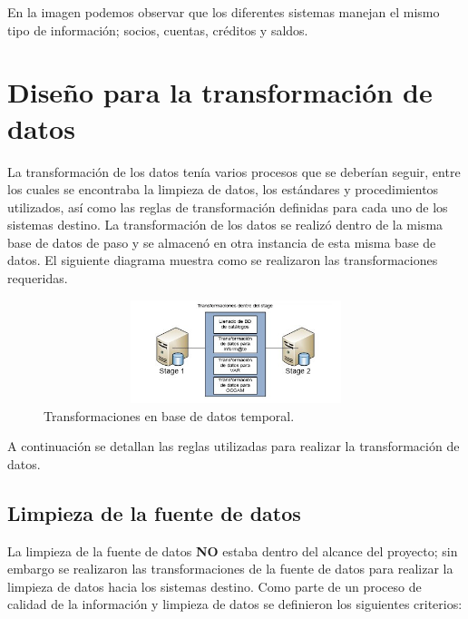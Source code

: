 En la imagen podemos observar que los diferentes sistemas manejan el mismo tipo
de información; socios, cuentas, créditos y saldos.

\section{Diseño para la transformación de datos}

La transformación de los datos tenía varios procesos que se deberían seguir,
entre los cuales se encontraba la limpieza de datos, los estándares y
procedimientos utilizados, así como las reglas de transformación definidas para
cada uno de los sistemas destino. La transformación de los datos se realizó
dentro de la misma base de datos de paso y se almacenó en otra instancia de esta
misma base de datos. El siguiente diagrama muestra como se realizaron las
transformaciones requeridas.

\begin{figure}[htb]
  \begin{center}
    \includegraphics[width=12cm, height=3cm, scale=0.5]{Transformaciones_stage.jpg}
    \caption{Transformaciones en base de datos temporal.}
    \label{fig:transformaciones-en-base-de-datos-temporal}
  \end{center}
\end{figure}

A continuación se detallan las reglas utilizadas para realizar la transformación
de datos.

\subsection{Limpieza de la fuente de datos}

La limpieza de la fuente de datos \textbf{NO} estaba dentro del alcance del
proyecto; sin embargo se realizaron las transformaciones de la fuente de datos
para realizar la limpieza de datos hacia los sistemas destino. Como parte de un
proceso de calidad de la información y limpieza de datos se definieron los
siguientes criterios:

